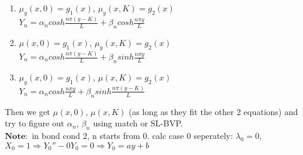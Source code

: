 \documentclass[10pt]{article}
\begin{document}
\begin{multicols}{2}
\begin{enumerate}
\begin{enumerate}
			\item $\mu_y(x,0) = g_1(x)$, $\mu_y(x,K) = g_2(x)$\\
			$Y_n = \alpha_n cosh\frac{n \pi (y-K)}{L} + \beta_n cosh\frac{n \pi y}{L}$ 
			\item $\mu(x,0) = g_1(x)$, $\mu_y(x,K) = g_2(x)$\\
			$Y_n = \alpha_n cosh\frac{n \pi (y-K)}{L} + \beta_n sinh\frac{n \pi y}{L}$ 
			\item $\mu_y(x,0) = g_1(x)$, $\mu(x,K) = g_2(x)$\\
			$Y_n = \alpha_n cosh\frac{n \pi y}{L} + \beta_n sinh\frac{n \pi (y-K)}{L}$                                                                       
		\end{enumerate}
		Then we get $\mu(x,0)$, $\mu(x,K)$ (as long as they fit the other 2 equations) and try to figure out $\alpha_n$, $\beta_n$ using match or SL-BVP. \\
		$\mathbf{Note}:$ in bond cond 2, n starts from 0. calc case 0 seperately: $\lambda_0 = 0$, $X_0 = 1 \Rightarrow Y_0'' - 0Y_0 = 0 \Rightarrow Y_0 = ay + b$\\
		\begin{comment}
			$\mathbf{Case2}$: $\lambda$:($Y(0) \ or \ Y'(0) = 0, Y(K) \ or \ Y'(K) = 0$)\\
			\begin{equation}
			\left\{
			\begin{array}{lr}
			Y''+\lambda X = 0, \ \ (SL-BVP)&\\
			\mu(0, y) = g_1(y), \mu(L, y) = g_2(x)\\
			\end{array}
			\right.
			\end{equation}
			$\Rightarrow$ find out $\lambda_n$ and $Y_n$ Then:
			$$ X''_n - \lambda_n X_n = 0, 0 < X < L$$
			$$ X_n = \alpha_n sinh\frac{n \pi x}{L} + \beta_n cosh\frac{n \pi x}{L} $$
			$$\mu(x,y) = \sum_{n = 1}^{\infty} (\alpha_n sinh\frac{n \pi x}{K} + \beta_n cosh\frac{n \pi x}{K}) Y_n$$
			For simplicity, we transform to:\\
			$$\mu(x,y) = \sum_{n = 1}^{\infty} (\alpha_n sinh\frac{n \pi x}{K} + \beta_n cosh\frac{n \pi (x-L)}{K}) Y_n$$
			Then we get $\mu(0, y)$, $\mu(L, y)$ (as long as they fit the other 2 equations) and try to figure out $\alpha_n$, $\beta_n$ using match or SL-BVP. \\
			$\mathbf{Note}:$ in bond cond 2, n starts from 0. calc case 0 seperately: $\lambda_0 = 0$, $Y_0 = 1 \Rightarrow X_0'' - 0X_0 = 0 \Rightarrow X_0 = ax + b$\\
		\end{comment}
		

\end{enumerate}
\end{multicols}
\end{document}
